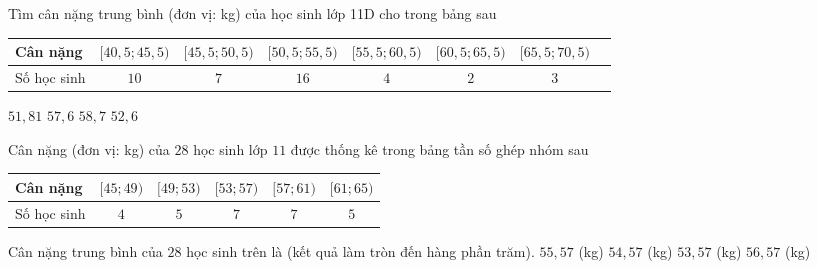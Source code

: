 

\begin{ex}%
	Tìm cân nặng trung bình (đơn vị: kg) của học sinh lớp 11D cho  trong bảng sau
	\begin{center}
		\begin{tabular}{|l|c|c|c|c|c|c|c|}
			\hline Cân nặng& {$[40{,}5;45{,}5)$} & {$ [45{,}5;50{,}5)$} & {$[50{,}5;55{,}5) $} &  {$[55{,}5;60{,}5)$} & {$[60{,}5;65{,}5)$} & {$[65{,}5;70{,}5)$}\\
			\hline Số học sinh & $10$ &  $7$ & $16$ & $4$& $2$& $3$ \\
			\hline 
		\end{tabular}
	\end{center}
	 \choice
		{ \True $51{,}81$} 
		 { $57{,}6$}
		 { $58{,}7$}
		{  $52{,}6$}
\end{ex}

\begin{ex}%
	Cân nặng (đơn vị: kg) của  $28$ học sinh lớp $11$ được thống kê trong bảng tần số ghép nhóm sau
	\begin{center}
		\begin{tabular}{|l|c|c|c|c|c|}
			\hline Cân  nặng & {$[45;49)$} & {$ [49;53)$} & {$[53;57) $} & {$[57;61)$} & {$[61;65)$} \\
			\hline Số học sinh & $4$ & $5$ & $7$ & $7$& $5$  \\
			\hline 
		\end{tabular}
	\end{center}
	Cân nặng trung bình của $28$ học sinh trên  là (kết quả làm tròn đến hàng phần trăm).
	 \choice
		{ \True $55{,}57$  (kg)}
		{ $54{,}57$ (kg)} 
		{ $53{,}57$  (kg)}
		{  $56{,}57$ (kg)}
\end{ex}

